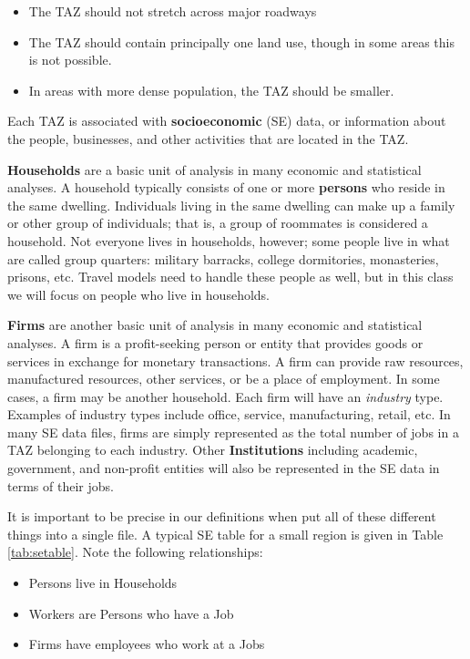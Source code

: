 \documentclass[
]{book}
\providecommand{\tightlist}{%
  \setlength{\itemsep}{0pt}\setlength{\parskip}{0pt}}
\begin{document}
\begin{itemize}
\tightlist
\item
  The TAZ should not stretch across major roadways
\item
  The TAZ should contain principally one land use, though in some areas this
  is not possible.
\item
  In areas with more dense population, the TAZ should be smaller.
\end{itemize}

Each TAZ is associated with \textbf{socioeconomic} (SE) data, or information about
the people, businesses, and other activities that are located in the TAZ.

\textbf{Households} are a basic unit of analysis in many economic and statistical
analyses. A household typically consists of one or more \textbf{persons} who reside
in the same dwelling. Individuals living in the same dwelling can make up a
family or other group of individuals; that is, a group of roommates is
considered a household. Not everyone lives in households, however; some people
live in what are called group quarters: military barracks, college dormitories,
monasteries, prisons, etc. Travel models need to handle these people as well, but
in this class we will focus on people who live in households.

\textbf{Firms} are another basic unit of analysis in many economic and statistical
analyses. A firm is a profit-seeking person or entity that provides goods or
services in exchange for monetary transactions. A firm can provide raw resources,
manufactured resources, other services, or be a place of employment. In some
cases, a firm may be another household. Each firm will have an \emph{industry} type.
Examples of industry types include office, service, manufacturing, retail, etc.
In many SE data files, firms are simply represented as the total number of
jobs in a TAZ belonging to each industry. Other \textbf{Institutions} including
academic, government, and non-profit entities will also be represented in the SE
data in terms of their jobs.

It is important to be precise in our definitions when put all of these different
things into a single file. A typical SE table for a small region is given in
Table \ref{tab:setable}. Note the following relationships:

\begin{itemize}
\tightlist
\item
  Persons live in Households
\item
  Workers are Persons who have a Job
\item
  Firms have employees who work at a Jobs
\end{itemize}
\end{document}
